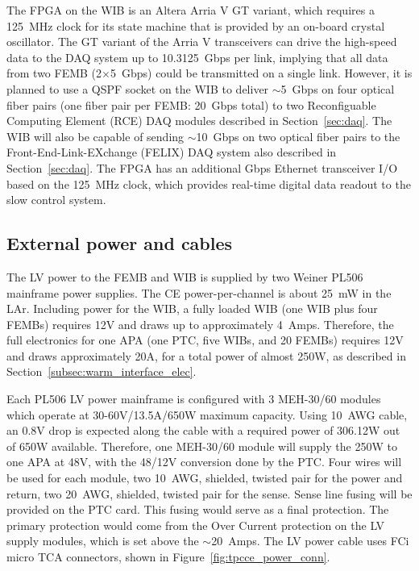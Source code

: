 The FPGA on the WIB is an Altera Arria V GT variant, which requires a
125~MHz clock for its state machine that is provided by an on-board crystal
oscillator. The GT variant of the Arria V
transceivers can drive the high-speed data to the DAQ system up to
10.3125~Gbps per link,  implying that all data from
two FEMB (2$\times$5~Gbps) could be transmitted on a single link. However, it is planned to
use a QSPF socket on the WIB to deliver $\sim$5~Gbps on four optical fiber pairs 
(one fiber pair per FEMB: 20~Gbps total) to two Reconfiguable Computing Element (RCE) DAQ modules 
described in Section~\ref{sec:daq}. The WIB will also be capable of sending $\sim$10~Gbps on 
two optical fiber pairs to the Front-End-Link-EXchange (FELIX) DAQ system also described in Section~\ref{sec:daq}.
The FPGA has an additional Gbps Ethernet transceiver I/O based on the 125~MHz clock, which 
provides real-time digital data readout to the slow control system.



%
\subsection{External power and cables}
\label{subsec:ce_feedthrough_power}

The LV power to the FEMB and WIB is supplied by two Weiner PL506 mainframe power supplies.
The CE power-per-channel is about 25~mW in the LAr.
Including power for the WIB, a fully loaded WIB (one WIB plus four FEMBs) requires
12V and draws up to approximately 4~Amps. Therefore, the full electronics for one APA (one PTC, five WIBs, and 20 FEMBs) 
requires 12V and draws approximately 20A, for a total power of almost 250W, as 
described in Section~\ref{subsec:warm_interface_elec}.

Each PL506 LV power mainframe is configured with 3 MEH-30/60 modules which
operate at 30-60V/13.5A/650W maximum capacity. Using 10~AWG cable, an 0.8V drop is expected along the cable with a
required power of 306.12W out of 650W available. %
Therefore, one MEH-30/60 module will supply the 250W to one APA at 48V, with the 48/12V conversion done by the PTC. 
Four wires will be used for each module, two 10~AWG,
shielded, twisted pair for the power and return, two 20~AWG, shielded, twisted pair for the sense. Sense line fusing will be
provided on the PTC card. This fusing would serve as
a final protection. The primary protection would come from the Over Current protection
on the LV supply modules, which is set above the $\sim$20~Amps. The LV power cable uses FCi micro TCA connectors, 
shown in Figure~\ref{fig:tpcce_power_conn}.


